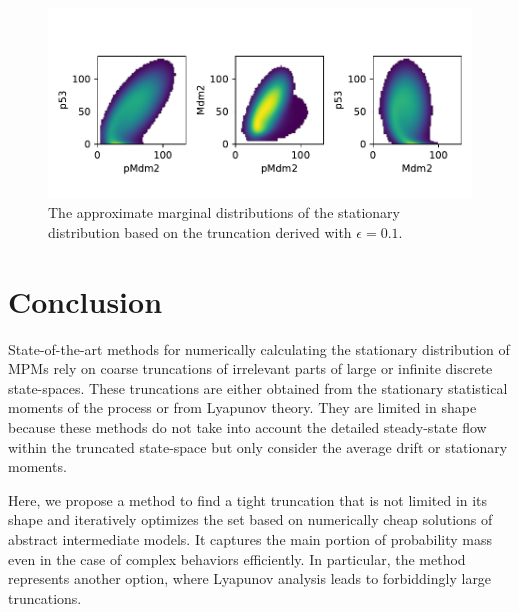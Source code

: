\begin{figure}[htb]
    \includegraphics[width=.9\textwidth]{gfx/p53_dist.pdf}
	\caption[approximate marginal distributions of the p53 stationary distribution]{The approximate marginal distributions of the stationary distribution based on the truncation derived with $\epsilon=0.1$.}
\label{fig:p53:dist}
\end{figure}

\section{Conclusion}
State-of-the-art methods for numerically calculating the stationary distribution of \aclp{MPM} rely on coarse truncations of irrelevant parts of large or infinite discrete state-spaces. 
These truncations are either obtained from the stationary statistical moments of the process or from
Lyapunov theory. They are limited in shape because these methods do not take into account the detailed 
steady-state flow within the truncated state-space but only consider the average drift or stationary moments.

Here, we propose a method to find a tight truncation
that is not limited in its shape and iteratively optimizes the set based on numerically cheap solutions
of abstract intermediate models. 
It   captures the main portion of probability mass even in the case of complex behaviors efficiently.
In particular, the method represents another option, where Lyapunov analysis leads to forbiddingly large truncations.


